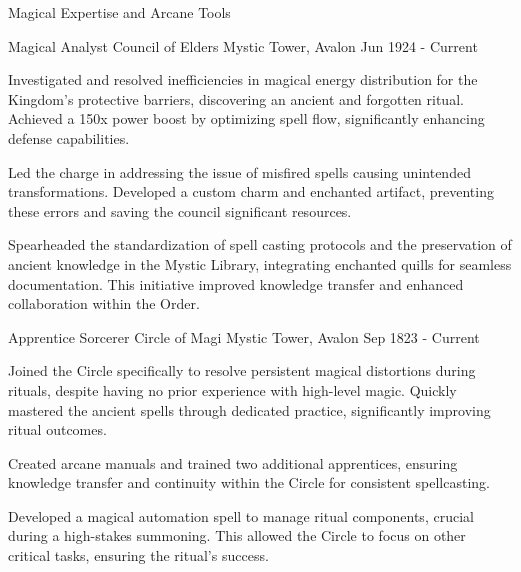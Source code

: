 \documentclass[11pt, a4paper]{awesome-cv}
\begin{document}
\begin{cvsubsection}{Magical Expertise and Arcane Tools}
\begin{cventries}
\cventry
{Magical Analyst}
{Council of Elders}
{Mystic Tower, Avalon}
{Jun 1924 - Current} 
{
\begin{cvitems}
    \item{\normalsize Investigated and resolved inefficiencies in
magical energy distribution for the Kingdom's protective barriers,
discovering an ancient and forgotten ritual. Achieved a 150x power boost
by optimizing spell flow, significantly enhancing defense capabilities.}
    \item{\normalsize Led the charge in addressing the issue of misfired
spells causing unintended transformations. Developed a custom charm and
enchanted artifact, preventing these errors and saving the council
significant resources.}
    \item{\normalsize Spearheaded the standardization of spell casting
protocols and the preservation of ancient knowledge in the Mystic
Library, integrating enchanted quills for seamless documentation. This
initiative improved knowledge transfer and enhanced collaboration within
the Order.}
\end{cvitems}
}
\cventry
{Apprentice Sorcerer}
{Circle of Magi}
{Mystic Tower, Avalon}
{Sep 1823 - Current} 
{
\begin{cvitems}
    \item{\normalsize Joined the Circle specifically to resolve
persistent magical distortions during rituals, despite having no prior
experience with high-level magic. Quickly mastered the ancient spells
through dedicated practice, significantly improving ritual outcomes.}
    \item{\normalsize Created arcane manuals and trained two additional
apprentices, ensuring knowledge transfer and continuity within the
Circle for consistent spellcasting.}
    \item{\normalsize Developed a magical automation spell to manage
ritual components, crucial during a high-stakes summoning. This allowed
the Circle to focus on other critical tasks, ensuring the ritual's
success.}
\end{cvitems}
}
\end{cventries}



\begin{cventries}



\end{cventries}
\end{cvsubsection}
\end{document}
